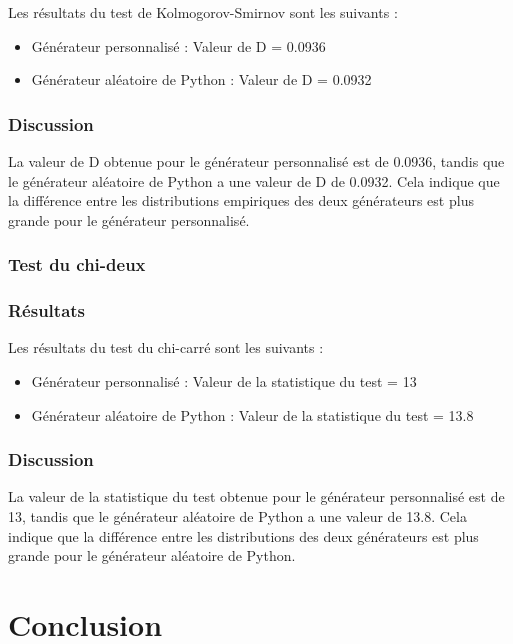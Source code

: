 \documentclass{article}
\begin{document}
Les résultats du test de Kolmogorov-Smirnov sont les suivants :

\begin{itemize}
  \item Générateur personnalisé : Valeur de D = 0.0936
  \item Générateur aléatoire de Python : Valeur de D = 0.0932
\end{itemize}

\subsubsection*{Discussion}

La valeur de D obtenue pour le générateur personnalisé est de 0.0936, tandis que le générateur aléatoire de Python a une valeur de D de 0.0932. Cela indique que la différence entre les distributions empiriques des deux générateurs est plus grande pour le générateur personnalisé.

\subsubsection*{Test du chi-deux}

\subsubsection*{Résultats}

Les résultats du test du chi-carré sont les suivants :

\begin{itemize}
  \item Générateur personnalisé : Valeur de la statistique du test = 13
  \item Générateur aléatoire de Python : Valeur de la statistique du test = 13.8
\end{itemize}

\subsubsection*{Discussion}

La valeur de la statistique du test obtenue pour le générateur personnalisé est de 13, tandis que le générateur aléatoire de Python a une valeur de 13.8. Cela indique que la différence entre les distributions des deux générateurs est plus grande pour le générateur aléatoire de Python.

\section{Conclusion}
\end{document}
